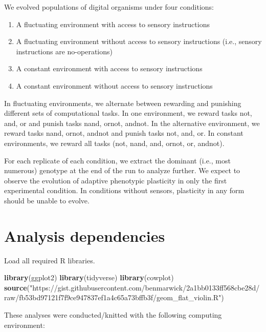 \documentclass[]{book}
\newenvironment{Shaded}{\begin{snugshade}}{\end{snugshade}}
\newcommand{\KeywordTok}[1]{\textcolor[rgb]{0.13,0.29,0.53}{\textbf{#1}}}
\newcommand{\NormalTok}[1]{#1}
\newcommand{\StringTok}[1]{\textcolor[rgb]{0.31,0.60,0.02}{#1}}
\providecommand{\tightlist}{%
  \setlength{\itemsep}{0pt}\setlength{\parskip}{0pt}}
\begin{document}
We evolved populations of digital organisms under four conditions:

\begin{enumerate}
\def\labelenumi{\arabic{enumi}.}
\tightlist
\item
  A fluctuating environment with access to sensory instructions
\item
  A fluctuating environment without access to sensory instructions (i.e., sensory instructions are no-operations)
\item
  A constant environment with access to sensory instructions
\item
  A constant environment without access to sensory instructions
\end{enumerate}

In fluctuating environments, we alternate between rewarding and punishing different sets of computational tasks.
In one environment, we reward tasks not, and, or and punish tasks nand, ornot, andnot.
In the alternative environment, we reward tasks nand, ornot, andnot and punish tasks not, and, or.
In constant environments, we reward all tasks (not, nand, and, ornot, or, andnot).

For each replicate of each condition, we extract the dominant (i.e., most numerous) genotype at the end of the run to analyze further.
We expect to observe the evolution of adaptive phenotypic plasticity in only the first experimental condition.
In conditions without sensors, plasticity in any form should be unable to evolve.

\hypertarget{analysis-dependencies}{%
\section{Analysis dependencies}\label{analysis-dependencies}}

Load all required R libraries.

\begin{Shaded}
\begin{Highlighting}[]
\KeywordTok{library}\NormalTok{(ggplot2)}
\KeywordTok{library}\NormalTok{(tidyverse)}
\KeywordTok{library}\NormalTok{(cowplot)}
\KeywordTok{source}\NormalTok{(}\StringTok{"https://gist.githubusercontent.com/benmarwick/2a1bb0133ff568cbe28d/raw/fb53bd97121f7f9ce947837ef1a4c65a73bffb3f/geom_flat_violin.R"}\NormalTok{)}
\end{Highlighting}
\end{Shaded}

These analyses were conducted/knitted with the following computing environment:
\end{document}
